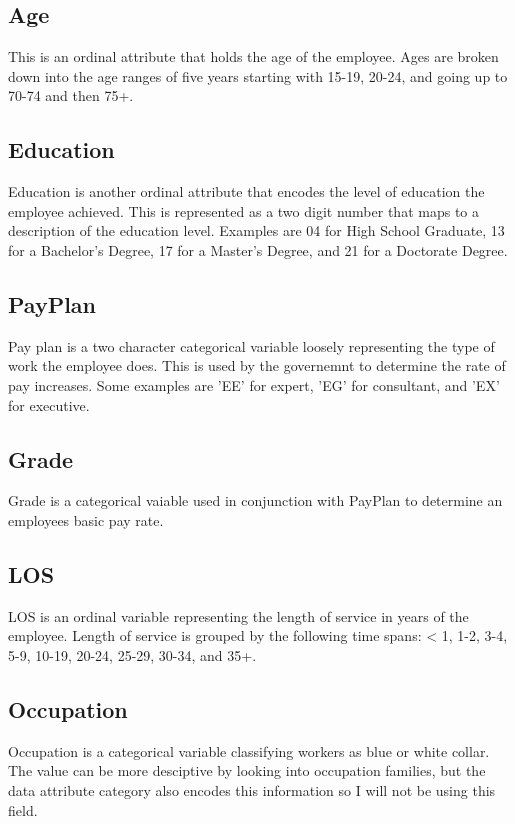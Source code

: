 \documentclass{article}
\begin{document}
    \subsection{Age}
    This is an ordinal attribute that holds the age of the employee. Ages are broken down into the age ranges of five years starting with 15-19, 20-24, and going up to 70-74 and then 75+.

    \subsection{Education}
    Education is another ordinal attribute that encodes the level of education the employee achieved. This is represented as a two digit number that maps to a description of the education level. Examples are 04 for High School Graduate, 13 for a Bachelor's Degree, 17 for a Master's Degree, and 21 for a Doctorate Degree.

    \subsection{PayPlan}
    Pay plan is a two character categorical variable loosely representing the type of work the employee does. This is used by the governemnt to determine the rate of pay increases. Some examples are 'EE' for expert, 'EG' for consultant, and 'EX' for executive.

    \subsection{Grade}
    Grade is a categorical vaiable used in conjunction with PayPlan to determine an employees basic pay rate.

    \subsection{LOS}
    LOS is an ordinal variable representing the length of service in years of the employee. Length of service is grouped by the following time spans: < 1, 1-2, 3-4, 5-9, 10-19, 20-24, 25-29, 30-34, and 35+.

    \subsection{Occupation}
    Occupation is a categorical variable classifying workers as blue or white collar. The value can be more desciptive by looking into occupation families, but the data attribute category also encodes this information so I will not be using this field.
\end{document}
